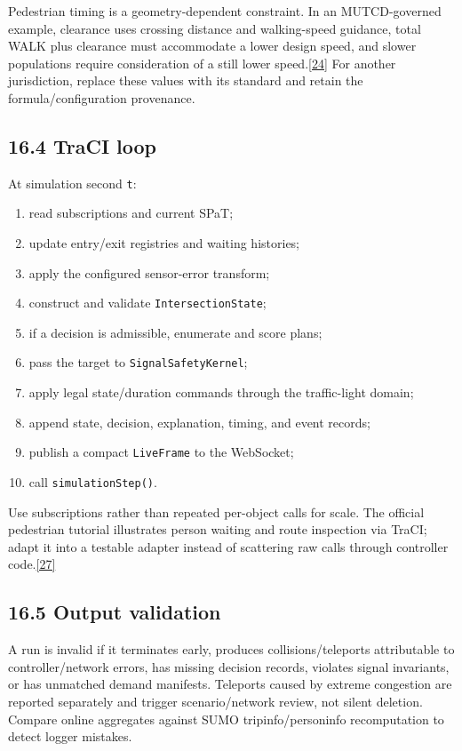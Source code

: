 \documentclass[
  english,
  11pt,
  a4paper,
]{article}
\providecommand{\tightlist}{%
  \setlength{\itemsep}{0pt}\setlength{\parskip}{0pt}}
\begin{document}
Pedestrian timing is a geometry-dependent constraint. In an
MUTCD-governed example, clearance uses crossing distance and
walking-speed guidance, total WALK plus clearance must accommodate a
lower design speed, and slower populations require consideration of a
still lower speed.\hyperref[source-24]{[24]} For another jurisdiction,
replace these values with its standard and retain the
formula/configuration provenance.

\subsection{16.4 TraCI loop}\label{traci-loop}

At simulation second \texttt{t}:

\begin{enumerate}
\def\labelenumi{\arabic{enumi}.}
\tightlist
\item
  read subscriptions and current SPaT;
\item
  update entry/exit registries and waiting histories;
\item
  apply the configured sensor-error transform;
\item
  construct and validate \texttt{IntersectionState};
\item
  if a decision is admissible, enumerate and score plans;
\item
  pass the target to \texttt{SignalSafetyKernel};
\item
  apply legal state/duration commands through the traffic-light domain;
\item
  append state, decision, explanation, timing, and event records;
\item
  publish a compact \texttt{LiveFrame} to the WebSocket;
\item
  call \texttt{simulationStep()}.
\end{enumerate}

Use subscriptions rather than repeated per-object calls for scale. The
official pedestrian tutorial illustrates person waiting and route
inspection via TraCI; adapt it into a testable adapter instead of
scattering raw calls through controller code.\hyperref[source-27]{[27]}

\subsection{16.5 Output validation}\label{output-validation}

A run is invalid if it terminates early, produces collisions/teleports
attributable to controller/network errors, has missing decision records,
violates signal invariants, or has unmatched demand manifests. Teleports
caused by extreme congestion are reported separately and trigger
scenario/network review, not silent deletion. Compare online aggregates
against SUMO tripinfo/personinfo recomputation to detect logger
mistakes.
\end{document}
